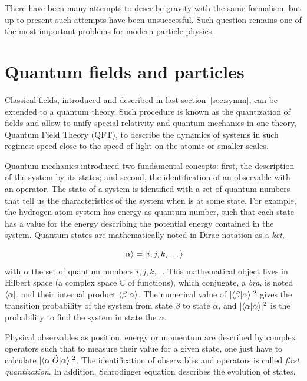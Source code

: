 There have been many attempts to describe gravity with the same formalism, but up to present such attempts have been unsuccessful. Such question remains one of the most important problems for modern particle physics.  

\section{Quantum fields and particles}
\label{sec:fields}

Classical fields, introduced and described in last section~\ref{sec:symm}, can be extended to a quantum theory. Such procedure is known as the quantization of fields and allow to unify special relativity and quantum mechanics in one theory, Quantum Field Theory (QFT), to describe the dynamics of systems in such regimes: speed close to the speed of light on the atomic or smaller scales.

Quantum mechanics introduced two fundamental concepts: first, the description of the system by its states; and second, the identification of an observable with an operator. The state of a system is identified with a set of quantum numbers that tell us the characteristics of the system when is at some state. For example, the hydrogen atom system has energy as quantum number, such that each state has a value for the energy describing the potential energy contained in the system. Quantum states are mathematically noted in Dirac notation as a \textit{ket},

\begin{equation}
  \label{eq:DiracNot}
  | \alpha\rangle=| i,j,k,\dots\rangle
\end{equation}with $\alpha$ the set of quantum numbers $i,j,k,\dots$ This mathematical object lives in Hilbert space (a complex space $\mathds{C}$ of functions), which conjugate, a \textit{bra}, is noted $\langle \alpha |$, and their internal product $\langle \beta | \alpha\rangle$. The numerical value of $|\langle \beta | \alpha\rangle|^{2}$ gives the transition probability of the system from state $\beta$ to state $\alpha$, and $|\langle \alpha | \alpha\rangle|^{2}$ is the probability to find the system in state the $\alpha$.

Physical observables as position, energy or momentum are described by complex operators such that to measure their value for a given state, one just have to calculate $|\langle \alpha |\hat{O}| \alpha\rangle|^{2}$. The identification of observables and operators is called \textit{first quantization}. In addition, Schrodinger equation describes the evolution of states,

